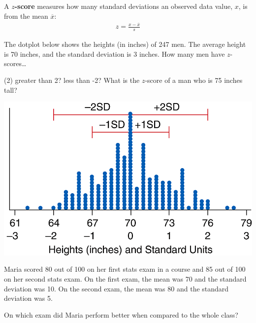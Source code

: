\documentclass[../mathNotesPreamble]{subfiles}
\begin{document}
  \begin{defn*}
    A \textbf{$z$-score} measures how many standard deviations an observed data value, $x$, is from the mean $\overline{x}$:
    \begin{align*}
      z=\frac{x-\overline{x}}{s}
    \end{align*}
  \end{defn*}
  
  \begin{ex*}
    The dotplot below shows the heights (in inches) of 247 men. The average height is 70 inches, and the standard deviation is 3 inches. How many men have $z$-scores\dots
    \begin{tasks}[after-item-skip=\baselineskip, label=\textbullet](2)
      \task greater than 2?
      \task less than -2?
      \task* What is the $z$-score of a man who is 75 inches tall?
    \end{tasks}
  \end{ex*}
  \begin{center}
    \includegraphics[width=0.6\linewidth]{images/math211_figure_3p12}
  \end{center}
  \pagebreak
  
  \begin{ex*}
    Maria scored 80 out of 100 on her first stats exam in a course and 85 out of 100 on her second stats exam. On the first exam, the mean was 70 and the standard deviation was 10. On the second exam, the mean was 80 and the standard deviation was 5.
    
    On which exam did Maria perform better when compared to the whole class?
  \end{ex*}

  \pagebreak
\end{document}
